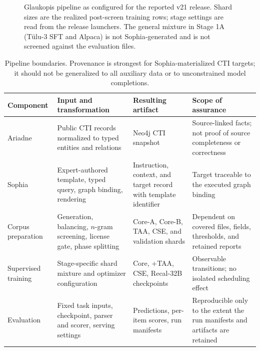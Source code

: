 \documentclass[a4paper,fleqn]{cas-dc}
\begin{document}
\begin{figure}
{}
\caption{Glaukopis pipeline as configured for the reported v21 release. Shard sizes are the realized post-screen training rows; stage settings are read from the release launchers. The general mixture in Stage 1A (T\"ulu-3 SFT and Alpaca) is not Sophia-generated and is not screened against the evaluation files.}\label{fig:pipeline}
\end{figure}

\begin{table}
\centering\footnotesize
\caption{Pipeline boundaries. Provenance is strongest for Sophia-materialized CTI targets; it should not be generalized to all auxiliary data or to unconstrained model completions.}\label{tab:boundaries}
\begin{tabularx}{\textwidth}{@{}P{2.4cm}XXX@{}}
\toprule Component & Input and transformation & Resulting artifact & Scope of assurance \\\midrule
Ariadne & Public CTI records normalized to typed entities and relations & Neo4j CTI snapshot & Source-linked facts; not proof of source completeness or correctness \\
Sophia & Expert-authored template, typed query, graph binding, rendering & Instruction, context, and target record with template identifier & Target traceable to the executed graph binding \\
Corpus preparation & Generation, balancing, $n$-gram screening, license gate, phase splitting & Core-A, Core-B, TAA, CSE, and validation shards & Dependent on covered files, fields, thresholds, and retained reports \\
Supervised training & Stage-specific shard mixture and optimizer configuration & Core, +TAA, CSE, Recal-32B checkpoints & Observable transitions; no isolated scheduling effect \\
Evaluation & Fixed task inputs, checkpoint, parser and scorer, serving settings & Predictions, per-item scores, run manifests & Reproducible only to the extent the run manifests and artifacts are retained \\\bottomrule
\end{tabularx}
\end{table}
\end{document}
